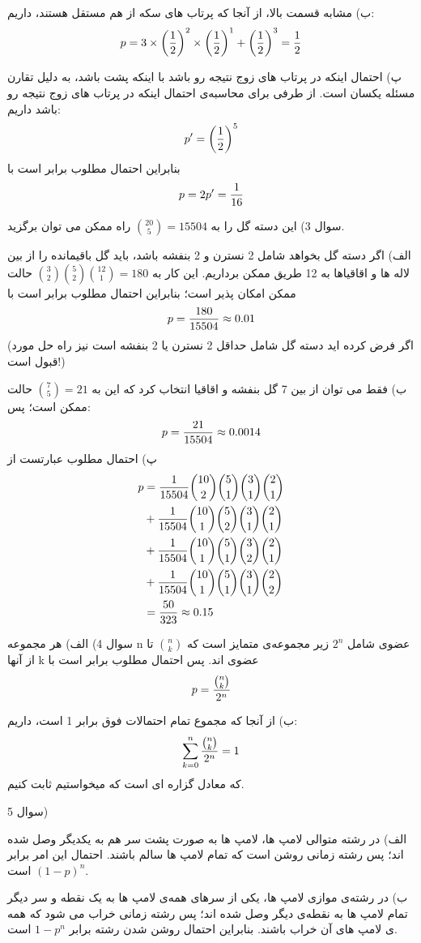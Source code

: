 \documentclass[10pt,letterpaper]{report}
\begin{document}
ب) مشابه قسمت بالا، از آنجا که پرتاب های سکه از هم مستقل هستند، داریم:
$$
p=3\times \left({1\over 2}\right)^2\times \left({1\over 2}\right)^1 +\left({1\over 2}\right)^{3}={1\over2}
$$

پ) احتمال اینکه در پرتاب های زوج نتیجه رو باشد با اینکه پشت باشد، به دلیل تقارن مسئله یکسان است. از طرفی برای محاسبه‌ی احتمال اینکه در پرتاب های زوج نتیجه رو باشد داریم:
$$
p'=\left({1\over 2}\right)^5
$$
بنابراین احتمال مطلوب برابر است با
$$
p=2p'={1\over 16}
$$

سوال 3) این دسته گل را به 
$
\binom{20}{5}=15504
$
راه ممکن می توان برگزید.

الف) اگر دسته گل بخواهد شامل 2 نسترن و 2 بنفشه باشد، باید گل باقیمانده را از بین لاله ها و اقاقیاها به 12 طریق ممکن برداریم. این کار به 
$
\binom{3}{2}\binom{5}{2}\binom{12}{1}=180
$
حالت ممکن امکان پذیر است؛ بنابراین احتمال مطلوب برابر است با
$$
p={180\over 15504}\approx0.01
$$
(اگر فرض کرده اید دسته گل شامل حداقل 2 نسترن یا 2 بنفشه است نیز راه حل مورد قبول است!)

ب) فقط می توان از بین 7 گل بنفشه و اقاقیا انتخاب کرد که این به 
$
\binom{7}{5}=21
$
حالت ممکن است؛ پس:
$$
p={21\over 15504}\approx0.0014
$$
پ) احتمال مطلوب عبارتست از
\[
\begin{split}
p&={1\over 15504}{\binom{10}{2}\binom{5}{1}\binom{3}{1}\binom{2}{1}}
\\&+{1\over 15504}{\binom{10}{1}\binom{5}{2}\binom{3}{1}\binom{2}{1}}
\\&+{1\over 15504}{\binom{10}{1}\binom{5}{1}\binom{3}{2}\binom{2}{1}}
\\&+{1\over 15504}{\binom{10}{1}\binom{5}{1}\binom{3}{1}\binom{2}{2}}
\\&={50\over 323}\approx0.15
\end{split}
\]

سوال 4) الف) هر مجموعه n عضوی شامل $2^n$ زیر مجموعه‌ی متمایز است که 
$
\binom{n}{k}
$
تا از آنها k عضوی اند. پس احتمال مطلوب برابر است با
$$
p={\binom{n}{k}\over 2^n}
$$

ب) از آنجا که مجموع تمام احتمالات فوق برابر 1 است، داریم:
$$
\sum_{k=0}^n{\binom{n}{k}\over 2^n}=1
$$
که معادل گزاره ای است که میخواستیم ثابت کنیم.

سوال 5)

الف) در رشته متوالی لامپ ها، لامپ ها به صورت پشت سر هم به یکدیگر وصل شده اند؛ پس رشته زمانی روشن است که تمام لامپ ها سالم باشند. احتمال این امر برابر 
$
(1-p)^n
$
است.

ب) در رشته‌ی موازی لامپ ها، یکی از سرهای همه‌ی لامپ ها به یک نقطه و سر دیگر تمام لامپ ها به نقطه‌ی دیگر وصل شده اند؛ پس رشته زمانی خراب می شود که همه ی لامپ های آن خراب باشند. بنابراین احتمال روشن شدن رشته برابر 
$
1-p^n
$
است.
\end{document}
